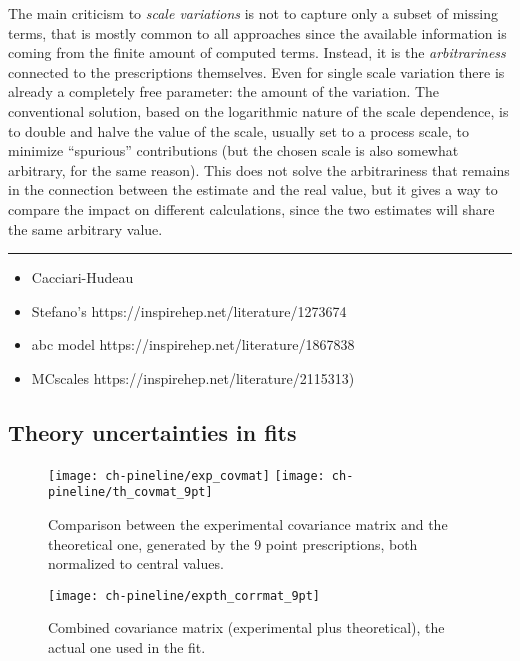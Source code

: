 The main criticism to \textit{scale variations} is not to capture only a subset
of missing terms, that is mostly common to all approaches since the available
information is coming from the finite amount of computed terms.
Instead, it is the \textit{arbitrariness} connected to the prescriptions
themselves.
%
Even for single scale variation there is already a completely free parameter:
the amount of the variation.
%
The conventional solution, based on the logarithmic nature of the scale
dependence, is to double and halve the value of the scale, usually set to a
process scale, to minimize \enquote{spurious} contributions (but the chosen
scale is also somewhat arbitrary, for the same reason).
%
This does not solve the arbitrariness that remains in the connection between
the estimate and the real value, but it gives a way to compare the impact on
different calculations, since the two estimates will share the same arbitrary
value.

\vspace*{20pt}
\noindent
\rule{\hsize}{1pt}

\begin{itemize}
	\item Cacciari-Hudeau
	\item  Stefano's https://inspirehep.net/literature/1273674
	\item abc model https://inspirehep.net/literature/1867838
	\item MCscales https://inspirehep.net/literature/2115313)
\end{itemize} 

\subsection{Theory uncertainties in \pdf fits}
\label{sec:pine/mhou-pdf}

\begin{figure}
	\centering
	\texttt{[image: ch-pineline/exp\_covmat]}
	\texttt{[image: ch-pineline/th\_covmat\_9pt]}
	\caption{
		Comparison between the experimental covariance matrix and the
		theoretical one, generated by the 9 point prescriptions, both
		normalized to central values.
	}
	\label{fig:pine/covmats}
\end{figure}

\begin{figure}
	\centering
	\texttt{[image: ch-pineline/expth\_corrmat\_9pt]}
	\caption{
		Combined covariance matrix (experimental plus theoretical), the actual
		one used in the  fit.
	}
	\label{fig:pine/combined-covmat}
\end{figure}

